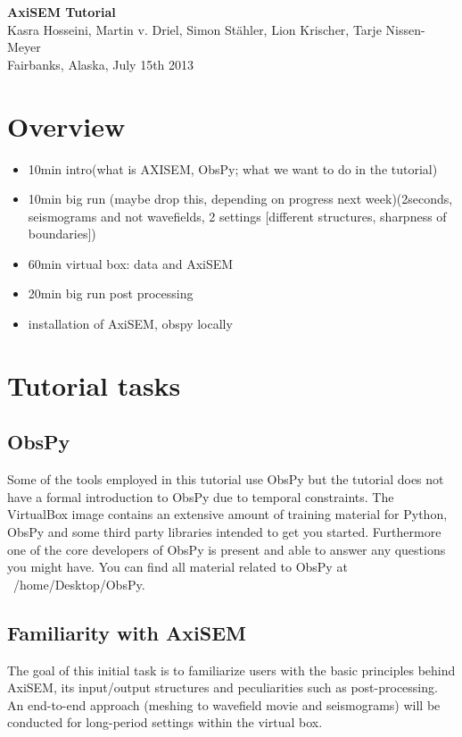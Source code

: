 \documentclass{article}
\begin{document}
\begin{center}
\title{}
\LARGE{ \textbf{\sc AxiSEM Tutorial}}
\vspace*{0.1cm}\\
{\large 
Kasra Hosseini, Martin v. Driel, Simon St\"{a}hler, 
Lion Krischer, Tarje Nissen-Meyer \\
{Fairbanks, Alaska, July 15th 2013}
}
\end{center}

\section{Overview}
\baselineskip=13pt
%
\begin{itemize}
\item 10min intro(what is AXISEM, ObsPy; what we want to do in the tutorial)
\item 10min big run (maybe drop this, depending on progress next week)(2seconds, seismograms 
and not wavefields, 2 settings [different structures, sharpness of boundaries])
\item  60min virtual box: data and AxiSEM
\item  20min big run post processing
\item installation of AxiSEM, obspy locally
\end{itemize}
%
\section{Tutorial tasks}
%
\subsection{ObsPy}
Some of the tools employed in this tutorial use ObsPy but the tutorial
does not have a formal introduction to ObsPy due to temporal
constraints. The VirtualBox image contains an extensive amount of
training material for Python, ObsPy and some third party libraries
intended to get you started. Furthermore one of the core developers of
ObsPy is present and able to answer any questions you might have. You
can find all material related to ObsPy at ~/home/Desktop/ObsPy.
%
\subsection{Familiarity with AxiSEM}
The goal of this initial task is to familiarize users with the basic
principles behind AxiSEM, its input/output structures and
peculiarities such as post-processing. An end-to-end approach (meshing to
wavefield movie and seismograms) will be conducted for long-period
settings within the virtual box.
%
\end{document}
